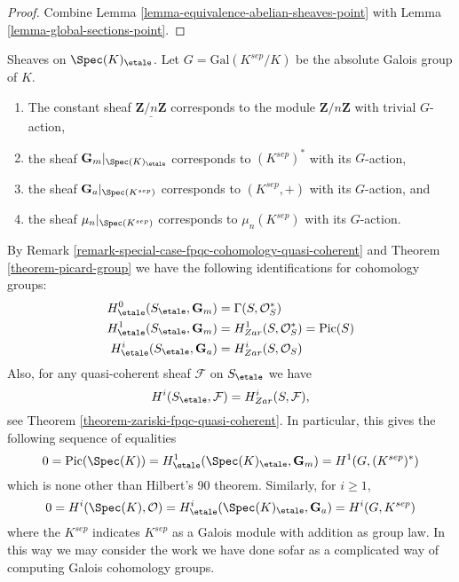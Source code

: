 \begin{proof}
Combine
Lemma \ref{lemma-equivalence-abelian-sheaves-point}
with
Lemma \ref{lemma-global-sections-point}.
\end{proof}

\begin{example}
\label{example-sheaves-point}
Sheaves on $\Spec(K)_\etale$.
Let $G = \text{Gal}(K^{sep}/K)$ be the absolute Galois group of $K$.
\begin{enumerate}
\item The constant sheaf $\underline{\mathbf{Z}/n\mathbf{Z}}$ corresponds to
the module $\mathbf{Z}/n\mathbf{Z}$ with trivial $G$-action,
\item the sheaf $\mathbf{G}_m|_{\Spec(K)_\etale}$ corresponds to
$(K^{sep})^*$ with its $G$-action,
\item the sheaf $\mathbf{G}_a|_{\Spec(K^{sep})}$ corresponds to
$(K^{sep}, +)$ with its $G$-action, and
\item the sheaf $\mu_n|_{\Spec(K^{sep})}$ corresponds to
$\mu_n(K^{sep})$ with its $G$-action.
\end{enumerate}
By
Remark \ref{remark-special-case-fpqc-cohomology-quasi-coherent}
and
Theorem \ref{theorem-picard-group}
we have the following identifications for cohomology groups:
\begin{align*}
H_\etale^0(S_\etale, \mathbf{G}_m) & =
\Gamma(S, \mathcal{O}_S^*) \\
H_\etale^1(S_\etale, \mathbf{G}_m) & =
H_{Zar}^1(S, \mathcal{O}_S^*) = \text{Pic}(S) \\
H_\etale^i(S_\etale, \mathbf{G}_a) & =
H_{Zar}^i(S, \mathcal{O}_S)
\end{align*}
Also, for any quasi-coherent sheaf $\mathcal{F}$ on $S_\etale$ we have
$$
H^i(S_\etale, \mathcal{F}) = H_{Zar}^i(S, \mathcal{F}),
$$
see
Theorem \ref{theorem-zariski-fpqc-quasi-coherent}.
In particular, this gives the following sequence of equalities
$$
0 =
\text{Pic}(\Spec(K)) =
H_\etale^1(\Spec(K)_\etale, \mathbf{G}_m) =
H^1(G, (K^{sep})^*)
$$
which is none other than Hilbert's 90 theorem. Similarly, for $i \geq 1$,
$$
0 = H^i(\Spec(K), \mathcal{O})
= H_\etale^i(\Spec(K)_\etale, \mathbf{G}_a)
= H^i(G, K^{sep})
$$
where the $K^{sep}$ indicates $K^{sep}$ as a Galois module with addition
as group law. In this way we may consider the work we have done sofar as
a complicated way of computing Galois cohomology groups.
\end{example}











